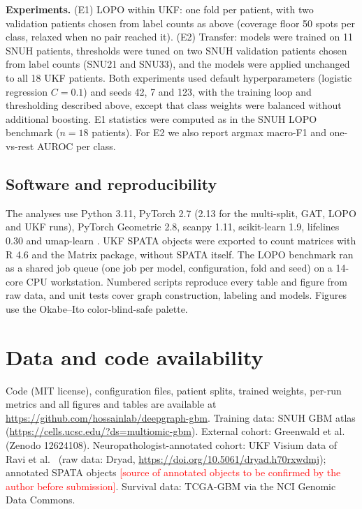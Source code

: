 \documentclass[11pt,letterpaper]{article}
\begin{document}
\textbf{Experiments.} (E1) LOPO within UKF: one fold per patient, with two validation patients chosen from label counts as above (coverage floor 50 spots per class, relaxed when no pair reached it). (E2) Transfer: models were trained on 11 SNUH patients, thresholds were tuned on two SNUH validation patients chosen from label counts (SNU21 and SNU33), and the models were applied unchanged to all 18 UKF patients. Both experiments used default hyperparameters (logistic regression $C = 0.1$) and seeds 42, 7 and 123, with the training loop and thresholding described above, except that class weights were balanced without additional boosting. E1 statistics were computed as in the SNUH LOPO benchmark ($n = 18$ patients). For E2 we also report argmax macro-F1 and one-vs-rest AUROC per class.

\subsection{Software and reproducibility}

The analyses use Python 3.11, PyTorch 2.7 (2.13 for the multi-split, GAT, LOPO and UKF runs), PyTorch Geometric 2.8, scanpy 1.11, scikit-learn 1.9, lifelines 0.30 and umap-learn \cite{mcinnes2018}. UKF SPATA objects were exported to count matrices with R 4.6 and the Matrix package, without SPATA itself. The LOPO benchmark ran as a shared job queue (one job per model, configuration, fold and seed) on a 14-core CPU workstation. Numbered scripts reproduce every table and figure from raw data, and unit tests cover graph construction, labeling and models. Figures use the Okabe--Ito color-blind-safe palette.

\section*{Data and code availability}
Code (MIT license), configuration files, patient splits, trained weights, per-run metrics and all figures and tables are available at \url{https://github.com/hossainlab/deepgraph-gbm}. Training data: SNUH GBM atlas \cite{park2026} (\url{https://cells.ucsc.edu/?ds=multiomic-gbm}). External cohort: Greenwald et al.\ \cite{greenwald2024} (Zenodo 12624108). Neuropathologist-annotated cohort: UKF Visium data of Ravi et al.\ \cite{ravi2022} (raw data: Dryad, \url{https://doi.org/10.5061/dryad.h70rxwdmj}); annotated SPATA objects \textcolor{red}{[source of annotated objects to be confirmed by the author before submission]}. Survival data: TCGA-GBM via the NCI Genomic Data Commons.
\end{document}
